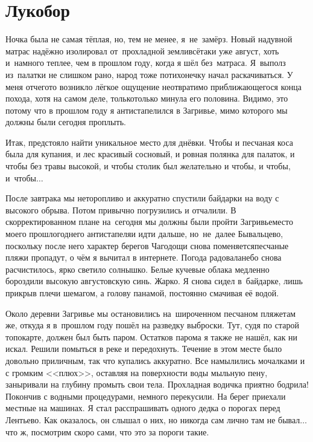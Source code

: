 \chapter{Лукобор} 
\vepsianrose

\vspace{5mm}
Ночка была не самая тёплая, но, тем не менее, я~не~замёрз. Новый надувной матрас надёжно изолировал от~прохладной земли\mdash всё\sdash таки уже август, хоть и~намного теплее, чем в прошлом году, когда я шёл без~матраса. Я~выполз из~палатки не слишком рано, народ тоже потихонечку начал раскачиваться. У меня отчего\sdash то возникло лёгкое ощущение неотвратимо приближающегося конца похода, хотя на самом деле, только\sdash только минула его половина. Видимо, это потому что в прошлом году я антистапелился в Загривье, мимо которого мы должны были сегодня проплыть. 
 
Итак, предстояло найти уникальное место для днёвки. Чтобы и песчаная коса была для купания, и лес красивый сосновый, и ровная полянка для палаток, и чтобы без травы высокой, и чтобы столик был желательно и чтобы, и чтобы, и~чтобы$\ldots$  

\newpage
После завтрака мы неторопливо и аккуратно спустили байдарки на воду с высокого обрыва. Потом привычно погрузились и отчалили. В скорректированном плане на~сегодня мы должны были пройти Загривье\mdash место моего прошлогоднего антистапеля\mdash и идти дальше, но~не~далее Бывальцево, поскольку после него характер берегов Чагодощи снова поменяется\mdash песчаные пляжи пропадут, о чём я вычитал в интернете. Погода радовала\mdash небо снова расчистилось, ярко светило солнышко. Белые кучевые облака медленно бороздили высокую августовскую синь. Жарко. Я снова сидел в~байдарке, лишь прикрыв плечи шемагом, а голову панамой, постоянно смачивая её водой. 

Около деревни Загривье мы остановились на~широченном песчаном пляже\mdash там же, откуда я в~прошлом году пошёл на разведку выброски. Тут, судя по старой топокарте, должен был быть паром. Остатков парома я также не нашёл, как ни искал. Решили помыться в реке и передохнуть. Течение в этом месте было довольно приличным, так что купались аккуратно. Все намылились мочалками и с громким <<плюх>>, оставляя на поверхности воды мыльную пену, заныривали на глубину промыть свои тела. Прохладная водичка приятно бодрила! Покончив с водными процедурами, немного перекусили. На берег приехали местные на машинах. Я стал расспрашивать одного дедка о порогах перед Лентьево. Как оказалось, он слышал о них, но никогда сам лично там не бывал$\ldots$ что ж, посмотрим скоро сами, что это за пороги такие. 

